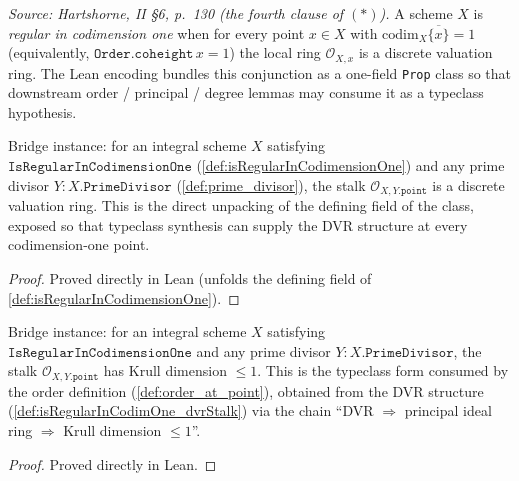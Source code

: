 \begin{definition}
  \label{def:isRegularInCodimensionOne}
  \textit{Source: Hartshorne, II \S6, p.~130 (the fourth clause of \((\ast)\)).}
  A scheme \(X\) is \emph{regular in codimension one} when for every point
  \(x \in X\) with \(\mathrm{codim}_X \overline{\{x\}} = 1\) (equivalently,
  \(\texttt{Order.coheight}\,x = 1\)) the local ring \(\mathcal O_{X,x}\) is
  a discrete valuation ring. The Lean encoding bundles this conjunction as
  a one-field \texttt{Prop} class so that downstream order / principal /
  degree lemmas may consume it as a typeclass hypothesis.
\end{definition}
\begin{definition}
  \label{def:isRegularInCodimOne_dvrStalk}
  Bridge instance: for an integral scheme \(X\) satisfying
  \(\texttt{IsRegularInCodimensionOne}\) (\ref{def:isRegularInCodimensionOne})
  and any prime divisor \(Y : X.\texttt{PrimeDivisor}\)
  (\ref{def:prime_divisor}), the stalk
  \(\mathcal O_{X, Y.\texttt{point}}\) is a discrete valuation ring. This is
  the direct unpacking of the defining field of the class, exposed so that
  typeclass synthesis can supply the DVR structure at every codimension-one
  point.
\end{definition}
\begin{proof}
  Proved directly in Lean (unfolds the defining field of
  \ref{def:isRegularInCodimensionOne}).
\end{proof}
\begin{definition}
  \label{def:isRegularInCodimOne_krullDimStalk}
  Bridge instance: for an integral scheme \(X\) satisfying
  \(\texttt{IsRegularInCodimensionOne}\) and any prime divisor
  \(Y : X.\texttt{PrimeDivisor}\), the stalk
  \(\mathcal O_{X, Y.\texttt{point}}\) has Krull dimension \(\leq 1\). This is
  the typeclass form consumed by the order definition
  (\ref{def:order_at_point}), obtained from the DVR structure
  (\ref{def:isRegularInCodimOne_dvrStalk}) via the chain
  ``DVR \(\Rightarrow\) principal ideal ring \(\Rightarrow\) Krull dimension
  \(\leq 1\)''.
\end{definition}
\begin{proof}
  Proved directly in Lean.
\end{proof}
